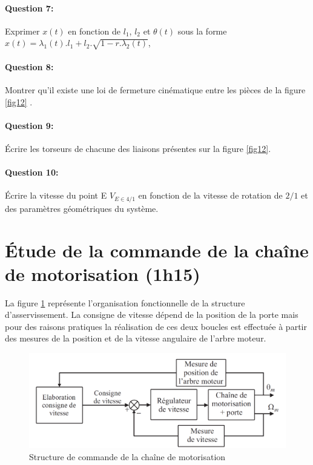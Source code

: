 \paragraph{Question 7:} Exprimer $x(t)$ en fonction de $l_1$, $l_2$ et $\theta(t)$ sous la forme $x(t)=\lambda_1(t).l_1+l_2.\sqrt{1-r.\lambda_2(t)}$,

\paragraph{Question 8:} Montrer qu'il existe une loi de fermeture cinématique entre les pièces de la figure \ref{fig12} .

\paragraph{Question 9:} Écrire les torseurs de chacune des liaisons présentes sur la figure \ref{fig12}.

\paragraph{Question 10:} Écrire la vitesse du point E $V_{E\in 4/1}$ en fonction de la vitesse de rotation de $2/1$ et des paramètres géométriques du système.

\section{Étude de la commande de la chaîne de motorisation (1h15)}

La figure \ref{asserv1} représente l'organisation fonctionnelle de la structure d'asservissement. La consigne de vitesse dépend de la position de la porte mais pour des raisons pratiques la réalisation de ces deux boucles est effectuée à partir des mesures de la position et de la vitesse angulaire de l'arbre moteur.

\begin{figure}[!h]
 \centering\includegraphics[width=0.8\linewidth]{img/asserv1}
 \caption{Structure de commande de la chaîne de motorisation}
 \label{asserv1}
\end{figure}

